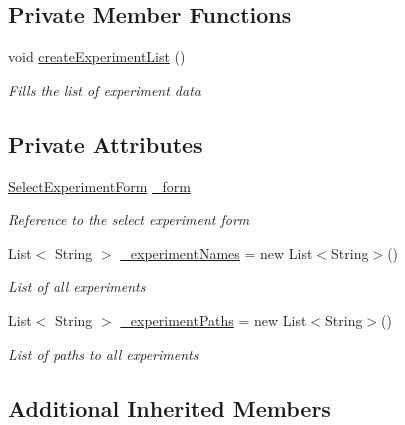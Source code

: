 \subsection*{Private Member Functions}
\begin{DoxyCompactItemize}
\item 
void \hyperlink{class_web_analyzer_1_1_u_i_1_1_interaction_objects_1_1_select_experiment_control_a37e45871530bf2689954cba405277eb8}{create\+Experiment\+List} ()
\begin{DoxyCompactList}\small\item\em Fills the list of experiment data \end{DoxyCompactList}\end{DoxyCompactItemize}
\subsection*{Private Attributes}
\begin{DoxyCompactItemize}
\item 
\hyperlink{class_web_analyzer_1_1_u_i_1_1_select_experiment_form}{Select\+Experiment\+Form} \hyperlink{class_web_analyzer_1_1_u_i_1_1_interaction_objects_1_1_select_experiment_control_ac6586d336cac091bf139064cf7a72a13}{\+\_\+form}
\begin{DoxyCompactList}\small\item\em Reference to the select experiment form \end{DoxyCompactList}\item 
List$<$ String $>$ \hyperlink{class_web_analyzer_1_1_u_i_1_1_interaction_objects_1_1_select_experiment_control_a00919951dc14d3a906f7da01402894b1}{\+\_\+experiment\+Names} = new List$<$String$>$()
\begin{DoxyCompactList}\small\item\em List of all experiments \end{DoxyCompactList}\item 
List$<$ String $>$ \hyperlink{class_web_analyzer_1_1_u_i_1_1_interaction_objects_1_1_select_experiment_control_a30f40ad6a4ba11a6cf945175cdda7f74}{\+\_\+experiment\+Paths} = new List$<$String$>$()
\begin{DoxyCompactList}\small\item\em List of paths to all experiments \end{DoxyCompactList}\end{DoxyCompactItemize}
\subsection*{Additional Inherited Members}


